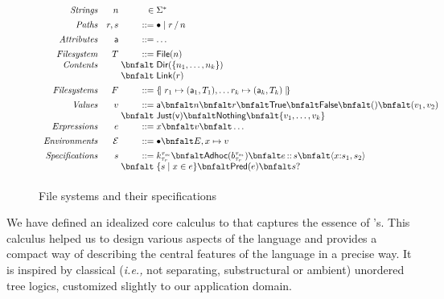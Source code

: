 \begin{figure}
\[
\begin{array}{rr@{\;}r@{\;}l}
\textit{Strings}        & n & \in & \Sigma^{\ast} \\[1ex]
\textit{Paths}          & r,s & \bnfdef & \PNil \mid \PCons{r}{n} \\[1ex]
\textit{Attributes}     & \att  & \bnfdef & \dots\\[1ex]
\textit{Filesystem}     & T  & \bnfdef & \File{n} \\
\textit{Contents}       &    & \bnfalt & \Dir{ \Set{n_1,\dots,n_k} }\\
                        &    & \bnfalt & \Link{r}\\[1ex]
\textit{Filesystems}    & F & \bnfdef & \Map{ r_1 \mapsto (\att_1,T_1), \dots r_k \mapsto (\att_k,T_k) }\\[1ex]
\textit{Values}         & v & \bnfdef & \att \bnfalt n \bnfalt r \bnfalt \True \bnfalt \False \bnfalt () \bnfalt (v_1,v_2) \\
                        &   & \bnfalt & \Just{v} \bnfalt \Nothing \bnfalt \{ v_1,\dots,v_k \}\\
\textit{Expressions}    & e & \bnfdef & x \bnfalt v \bnfalt \dots \\[1ex]
\textit{Environments}   & \Env & \bnfdef & \ENil \bnfalt E,x\mapsto v \\[1ex]
\textit{Specifications} & s & \bnfdef & \Sk 
                              \bnfalt \SAdhoc{b}
                              \bnfalt \SPath{e}{s}
                              \bnfalt \SPair{x}{s_1}{s_2}\\
                        &   & \bnfalt & \SSetComp{s}{x}{e}
                              \bnfalt \SPred{e}
                              \bnfalt \SOption{s}\\[1ex]
\end{array}
\]
\caption{File systems and their specifications}
\label{fig:calculus-syntax}
\end{figure}

We have defined an idealized core calculus to that captures the
essence of \forest{}'s.  This calculus helped us to design various
aspects of the language and provides a compact way of describing the
central features of the language in a precise way.  It is inspired by
classical ({\em i.e.,} not separating, substructural or ambient)
unordered tree logics, customized slightly to our application domain.

